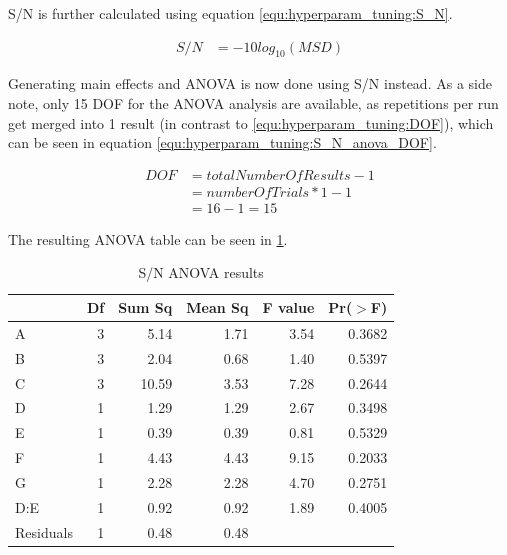 S/N is further calculated using equation \ref{equ:hyperparam_tuning:S_N}.

\begin{equation} \label{equ:hyperparam_tuning:S_N}
	\begin{split}
		S/N & = -10 log_{10} (MSD)
	\end{split}
\end{equation}

Generating main effects and ANOVA is now done using S/N instead. As a side note, only 15 DOF for the ANOVA analysis are available, as repetitions per run get merged into 1 result (in contrast to \ref{equ:hyperparam_tuning:DOF}), which can be seen in equation \ref{equ:hyperparam_tuning:S_N_anova_DOF}.

\begin{equation} \label{equ:hyperparam_tuning:S_N_anova_DOF}
	\begin{split}
		DOF & = totalNumberOfResults - 1 \\
		& = numberOfTrials * 1 - 1 \\
		& = 16 - 1 = 15
	\end{split}
\end{equation}

The resulting ANOVA table can be seen in \ref{tab:hyperparameter_tuning:s_n_anova_results}.

\begin{table}[ht]
	\centering
	\begin{tabular}{lrrrrr}
		\hline
		& Df & Sum Sq & Mean Sq & F value & Pr($>$F) \\ 
		\hline
		A & 3 & 5.14 & 1.71 & 3.54 & 0.3682 \\ 
		B & 3 & 2.04 & 0.68 & 1.40 & 0.5397 \\ 
		C & 3 & 10.59 & 3.53 & 7.28 & 0.2644 \\ 
		D & 1 & 1.29 & 1.29 & 2.67 & 0.3498 \\ 
		E & 1 & 0.39 & 0.39 & 0.81 & 0.5329 \\ 
		F & 1 & 4.43 & 4.43 & 9.15 & 0.2033 \\ 
		G & 1 & 2.28 & 2.28 & 4.70 & 0.2751 \\ 
		D:E & 1 & 0.92 & 0.92 & 1.89 & 0.4005 \\ 
		Residuals & 1 & 0.48 & 0.48 &  &  \\ 
		\hline
	\end{tabular}
		\caption{S/N ANOVA results}
	\label{tab:hyperparameter_tuning:s_n_anova_results}
\end{table}

